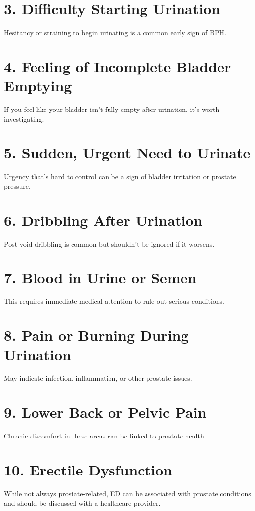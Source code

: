 \documentclass[11pt,oneside,openany]{book}
\begin{document}
\section*{3. Difficulty Starting Urination}
Hesitancy or straining to begin urinating is a common early sign of BPH.

\section*{4. Feeling of Incomplete Bladder Emptying}
If you feel like your bladder isn't fully empty after urination, it's worth investigating.

\section*{5. Sudden, Urgent Need to Urinate}
Urgency that's hard to control can be a sign of bladder irritation or prostate pressure.

\section*{6. Dribbling After Urination}
Post-void dribbling is common but shouldn't be ignored if it worsens.

\section*{7. Blood in Urine or Semen}
This requires immediate medical attention to rule out serious conditions.

\section*{8. Pain or Burning During Urination}
May indicate infection, inflammation, or other prostate issues.

\section*{9. Lower Back or Pelvic Pain}
Chronic discomfort in these areas can be linked to prostate health.

\section*{10. Erectile Dysfunction}
While not always prostate-related, ED can be associated with prostate conditions and should be discussed with a healthcare provider.
\end{document}
